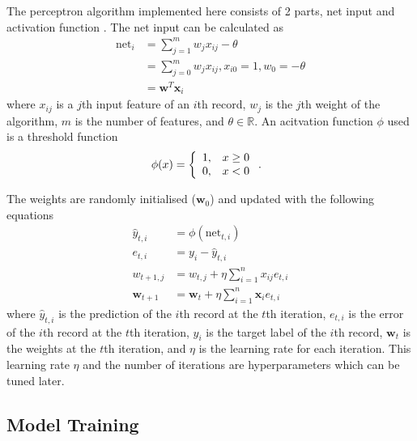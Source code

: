 \documentclass[10pt,twocolumn,letterpaper]{article}
\def\sumin{\sum_{i=1}^{n}}
\begin{document}
The perceptron algorithm implemented here consists of 2 parts, net input and activation function
\citep{perceptron}. The net input can be calculated as
\begin{align}
  \text{net}_i &= \sum_{j=1}^{m} w_j x_{ij} - \theta  \\
  &= \sum_{j=0}^{m} w_j x_{ij}, x_{i0} = 1, w_0 = -\theta \\
  &= \bm{w}^T\bm{x}_i \label{eq:net-input}
\end{align}
where \( x_{ij} \) is a \( j \)th input feature of an \( i \)th record, \( w_j \) is the \( j \)th weight of the
algorithm, \( m \) is the number of features, and \( \theta\in\mathbb{R} \). An acitvation function \( \phi \)
used is a threshold function
\begin{align}
  \phi(x) &= \left\{
    \begin{array}{ll}
      1, & x \ge 0 \\
      0, & x < 0
    \end{array}
  \right.\rlap{.} \label{eq:threshold-function}
\end{align}

The weights are randomly initialised (\( \bm{w}_0 \)) and updated with the following equations
\begin{align}
  \hat{y}_{t,i} &= \phi(\text{net}_{t,i}) \\
  e_{t,i} &= y_i - \hat{y}_{t,i} \\
  w_{t+1,j} &= w_{t,j} + \eta\sumin x_{ij}e_{t,i} \\
  \bm{w}_{t+1} &= \bm{w}_t + \eta\sumin\bm{x}_i e_{t,i}
\end{align}
where $\hat{y}_{t,i}$ is the prediction of the $i$th record at the $t$th iteration, $e_{t,i}$ is the error of
the $i$th record at the $t$th iteration, $y_i$ is the target label of the $i$th record, $\bm{w}_t$ is the
weights at the $t$th iteration, and $\eta$ is the learning rate for each iteration. This learning rate $\eta$
and the number of iterations are hyperparameters which can be tuned later.

\subsection{Model Training}
\end{document}
